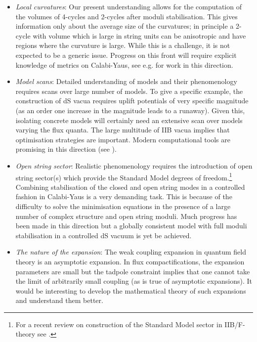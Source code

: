 \begin{itemize}
\item \textit{Local curvatures}: Our present understanding   allows for the computation of the volumes of 4-cycles and 2-cycles after moduli stabilisation. This gives information only about the average size of the curvatures; in principle a 2-cycle with volume which is large in string units can be anisotropic and have regions where the curvature is large. While this is a challenge, it is not expected to be a generic issue.
Progress on this front will require explicit knowledge of metrics on Calabi-Yaus, see e.g. \cite{Headrick:2005ch, Ashmore:2021ohf, Gerdes:2022nzr} for work in this direction.

\item \textit{Model scans}: Detailed understanding of models and their phenomenology requires scans over large number of models. To give a specific example, 
the construction of dS vacua requires uplift potentials of very specific magnitude (as an order one increase in the magnitude leads to a runaway). Given this,
isolating concrete models will certainly need an extensive scan over models varying the flux quanta. The large multitude of IIB vacua implies that optimisation strategies are important. Modern computational tools are promising  in this direction (see \cite{He:2017aed, Ruehle:2020jrk, Cole:2021nnt, Abel:2022nje, Abel:2021ddu}).

\item \textit{Open string sector}: Realistic phenomenology requires the introduction of  open string sector(s) which provide the Standard Model degrees of freedom.\footnote{For a recent review on construction of the Standard Model sector in IIB/F-theory see \cite{Marchesano:2022qbx}.} 
Combining stabilisation of the closed and open string modes in a controlled fashion in Calabi-Yaus  is a very demanding task. This is  because of the difficulty to solve the minimisation equations in the presence of a large number of complex structure and open string moduli. Much progress has been made in this direction \cite{Conlon:2008wa,Krippendorf:2010hj, Cicoli:2011qg, Cicoli:2012vw, Cicoli:2013mpa, Cicoli:2013cha, Cicoli:2016xae, Cicoli:2017shd, Cicoli:2017axo} but a globally consistent model with full moduli stabilisation in a controlled dS vacuum is yet be achieved.

\item \textit{The nature of the expansion}: The weak coupling expansion in quantum field theory is an asymptotic expansion. In flux compactifications, the expansion parameters are small but the tadpole constraint implies that one cannot take the limit of arbitrarily small coupling (as is true of asymptotic expansions). It would be interesting to develop the mathematical theory of such expansions and understand them better.
\end{itemize}

